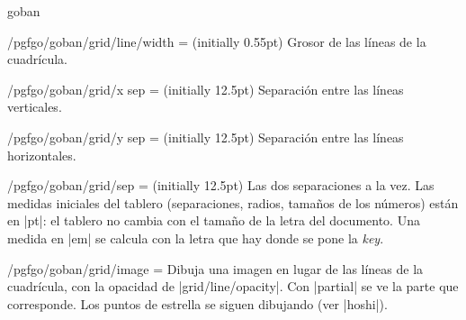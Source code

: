 \begin{environment}{{goban}}
\begin{key}{/pgfgo/goban/grid/line/width = (initially 0.55pt)}
		Grosor de las líneas de la cuadrícula.
		
		\begin{codeexample}[]
			
			\begin{goban}[name = a]
			\end{goban}
			
			\begin{goban}[grid = {line = {width = 1.5pt}}, resume = a]
			\end{goban}
		\end{codeexample}
	\end{key}
	
	\begin{key}{/pgfgo/goban/grid/x sep = (initially 12.5pt)}
		Separación entre las líneas verticales.
	\end{key}
	
	\begin{key}{/pgfgo/goban/grid/y sep = (initially 12.5pt)}
		Separación entre las líneas horizontales.
	\end{key}
	
	\begin{key}{/pgfgo/goban/grid/sep = (initially 12.5pt)}
		Las dos separaciones a la vez. Las medidas iniciales del tablero (separaciones, radios, tamaños de los números) están en |pt|: el tablero no cambia con el tamaño de la letra del documento. Una medida en |em| se calcula con la letra que hay donde se pone la \emph{key}.

		\begin{codeexample}[]
			\begin{goban}[5, grid = {x sep = 1.8em}]
			\end{goban}

			\begin{goban}[5, grid = {sep = 0.9em}]
			\end{goban}
		\end{codeexample}
	\end{key}

	\begin{key}{/pgfgo/goban/grid/image =}
		Dibuja una imagen en lugar de las líneas de la cuadrícula, con la opacidad de |grid/line/opacity|. Con |partial| se ve la parte que corresponde. Los puntos de estrella se siguen dibujando (ver |hoshi|).


\end{key}
\end{environment}
